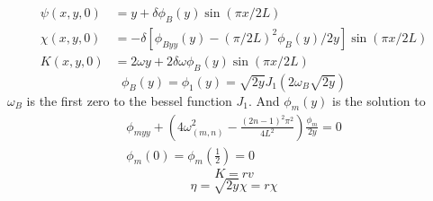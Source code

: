 \documentclass{X:/Documents/Coding/Latex/myreport}
\begin{document}
\clearpage



 









\begin{align*}
  \psi(x,y,0) &= y + \delta \phi_B(y) \sin(\pi x/2L)\\
  \chi(x,y,0) &= -\delta[\phi_{Byy}(y) -(\pi/2L)^2 \phi_B(y)/2y]\sin(\pi x/2L)\\
  K(x,y,0) &= 2 \omega y + 2  \delta \omega \phi_B(y) \sin (\pi x/2L)
\end{align*}
\[\phi_B(y) = \phi_1(y) = \sqrt{2y} J_1(2\omega_B \sqrt{2y})\]
$\omega_B$ is the first zero to the bessel function $J_1$.
And $\phi_{m}(y)$ is the solution to
\begin{align*}
    \phi_{myy} + \left(4 \omega^2_{(m,n)} - \frac{(2n -1)^2 \pi^2}{4L^2}\right) \frac{\phi_m}{2y} = 0\\
    \phi_m(0) = \phi_m(\frac12) = 0
\end{align*}
\[K = rv\]
\[\eta = \sqrt{2y} \chi = r \chi \]
\end{document}
